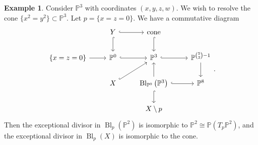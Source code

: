 \documentclass[10pt,letterpaper,cm]{nupset}
\theoremstyle{definition}
\newtheorem{exmp}[defn]{Example}
\theoremstyle{theorem}
\theoremstyle{remark}
\renewcommand{\P}{\mathbb P}
\newcommand{\1}{\mathbb{1}}
\newcommand{\0}{\vec 0}
\DeclareMathOperator{\bl}{\mathrm{Bl}}
\begin{document}
\begin{exmp}
Consider $\P^3$ with coordinates $\left(x,y,z,w\right)$. We wish to resolve the cone $\{x^2 = y^2\} \subset \P^3$. Let $p = \{x=z=0\}$.
We have a commutative diagram
\[
\begin{tikzcd}
                    & Y \arrow[d, hook] \arrow[r, hook] & \text{cone} \arrow[d, hook]                                           &                               \\
\{x=z=0\} \arrow[r] & \P^0 \arrow[r, hook]              & \P^3 \arrow[r, hook]                                                  & \P^{{5\choose 2}-1} \arrow[d] \\
                    & X \arrow[ru, hook]                & \bl_{\P^0}\left(\P^3\right) \arrow[r, hook] \arrow[d, hook] \arrow[u] & \P^8                          \\
                    &                                   & X\setminus p                                                          &                              
\end{tikzcd}
.\] Then the exceptional divisor in $\bl_p\left(\P^2\right)$ is isomorphic to $\P^2 \cong \P\left(T_p{\P^2}\right)$, and the exceptional divisor in $\bl_p(X)$ is isomorphic to the cone.
\end{exmp}
\end{document}
